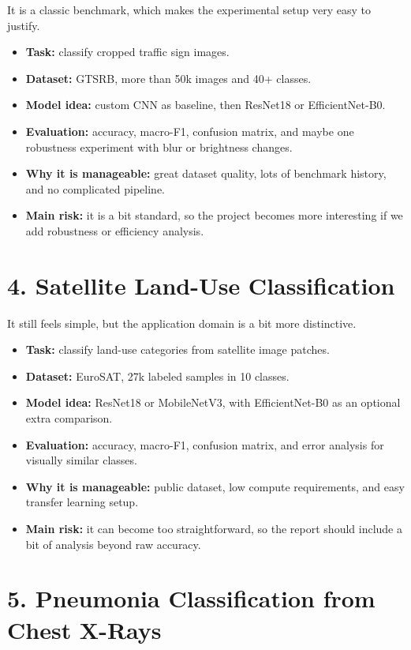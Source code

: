 \documentclass[11pt,a4paper]{article}
\begin{document}
It is a classic benchmark, which makes the experimental setup very easy to justify.

\begin{itemize}
\item \textbf{Task:} classify cropped traffic sign images.
\item \textbf{Dataset:} GTSRB, more than 50k images and 40+ classes.
\item \textbf{Model idea:} custom CNN as baseline, then ResNet18 or EfficientNet-B0.
\item \textbf{Evaluation:} accuracy, macro-F1, confusion matrix, and maybe one robustness experiment with blur or brightness changes.
\item \textbf{Why it is manageable:} great dataset quality, lots of benchmark history, and no complicated pipeline.
\item \textbf{Main risk:} it is a bit standard, so the project becomes more interesting if we add robustness or efficiency analysis.
\end{itemize}

\section{4. Satellite Land-Use Classification}

It still feels simple, but the application domain is a bit more distinctive.

\begin{itemize}
\item \textbf{Task:} classify land-use categories from satellite image patches.
\item \textbf{Dataset:} EuroSAT, 27k labeled samples in 10 classes.
\item \textbf{Model idea:} ResNet18 or MobileNetV3, with EfficientNet-B0 as an optional extra comparison.
\item \textbf{Evaluation:} accuracy, macro-F1, confusion matrix, and error analysis for visually similar classes.
\item \textbf{Why it is manageable:} public dataset, low compute requirements, and easy transfer learning setup.
\item \textbf{Main risk:} it can become too straightforward, so the report should include a bit of analysis beyond raw accuracy.
\end{itemize}

\section{5. Pneumonia Classification from Chest X-Rays}
\end{document}
